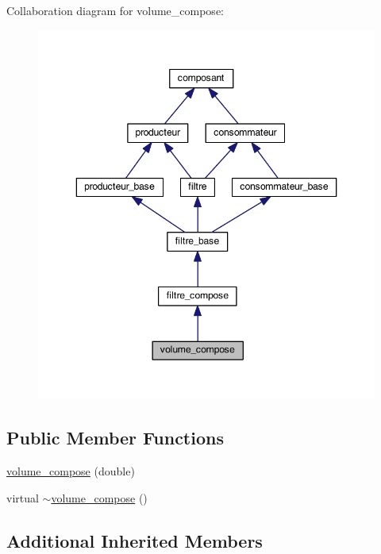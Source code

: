 Collaboration diagram for volume\-\_\-compose\-:
\nopagebreak
\begin{figure}[H]
\begin{center}
\leavevmode
\includegraphics[width=346pt]{classvolume__compose__coll__graph}
\end{center}
\end{figure}
\subsection*{Public Member Functions}
\begin{DoxyCompactItemize}
\item 
\hyperlink{classvolume__compose_a3ac65c841ee3c62547ff06fc8d0d6189}{volume\-\_\-compose} (double)
\item 
virtual \hyperlink{classvolume__compose_a9d46c6f3b0ca645fc57c04fdc40fc5d7}{$\sim$volume\-\_\-compose} ()
\end{DoxyCompactItemize}
\subsection*{Additional Inherited Members}


